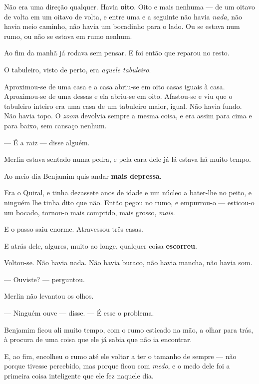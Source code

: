 \documentclass[livro.tex]{subfiles}
\begin{document}
Não era uma direção qualquer. Havia \textbf{oito}. Oito e mais nenhuma --- de um oitavo de volta em um oitavo de
volta, e entre uma e a seguinte não havia \emph{nada}, não havia meio caminho, não havia um bocadinho para o lado.
Ou se estava num rumo, ou não se estava em rumo nenhum.

Ao fim da manhã já rodava sem pensar. E foi então que reparou no resto.

\medskip

O tabuleiro, visto de perto, era \emph{aquele tabuleiro}.

Aproximou-se de uma casa e a casa abriu-se em oito casas iguais à casa. Aproximou-se de uma dessas e ela abriu-se
em oito. Afastou-se e viu que o tabuleiro inteiro era uma casa de um tabuleiro maior, igual. Não havia fundo. Não
havia topo. O \emph{zoom} devolvia sempre a mesma coisa, e era assim para cima e para baixo, sem cansaço nenhum.

--- É a raiz --- disse alguém.

Merlin estava sentado numa pedra, e pela cara dele já lá estava há muito tempo.

\medskip

Ao meio-dia Benjamim quis andar \textbf{mais depressa}.

Era o Quiral, e tinha dezassete anos de idade e um núcleo a bater-lhe no peito, e ninguém lhe tinha dito que não.
Então pegou no rumo, e empurrou-o --- esticou-o um bocado, tornou-o mais comprido, mais grosso, \emph{mais}.

E o passo saiu enorme. Atravessou três casas.

E atrás dele, algures, muito ao longe, qualquer coisa \textbf{escorreu}.

\medskip

Voltou-se. Não havia nada. Não havia buraco, não havia mancha, não havia som.

--- Ouviste? --- perguntou.

Merlin não levantou os olhos.

--- Ninguém ouve --- disse. --- É esse o problema.

\medskip

Benjamim ficou ali muito tempo, com o rumo esticado na mão, a olhar para trás, à procura de uma coisa que ele já
sabia que não ia encontrar.

E, ao fim, encolheu o rumo até ele voltar a ter o tamanho de sempre --- não porque tivesse percebido, mas porque
ficou com \emph{medo}, e o medo dele foi a primeira coisa inteligente que ele fez naquele dia.
\end{document}
